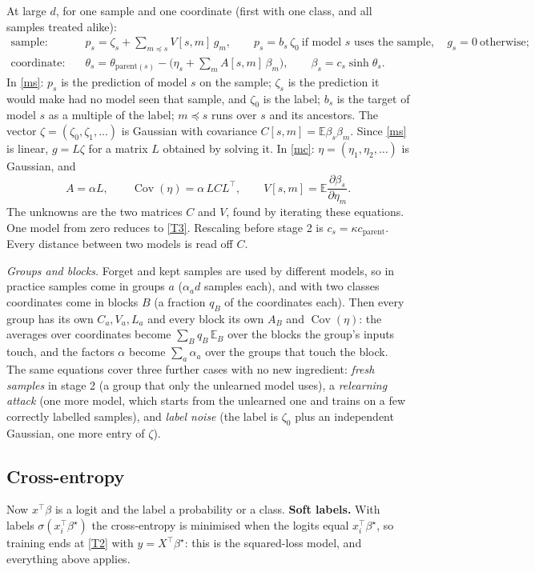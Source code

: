 \documentclass[10pt]{article}
\newcommand{\bs}{\beta^\star}\newcommand{\E}{\mathbb E}\newcommand{\asinh}{\operatorname{arcsinh}}\newcommand{\prox}{\operatorname{prox}}
\begin{document}
At large $d$, for one sample and one coordinate (first with one class, and all samples treated alike):
\begin{align}
\text{sample:}&\quad p_s=\zeta_s+\sum_{m\preceq s}V[s,m]\,g_m ,\qquad p_s=b_s\,\zeta_0\ \text{if model $s$ uses the sample},\quad g_s=0\ \text{otherwise};\label{ms}\\
\text{coordinate:}&\quad \theta_s=\theta_{\text{parent}(s)}-\Big(\eta_s+\sum_{m}A[s,m]\,\beta_m\Big),\qquad \beta_s=c_s\sinh\theta_s .\label{mc}
\end{align}
In \eqref{ms}: $p_s$ is the prediction of model $s$ on the sample; $\zeta_s$ is the prediction it would make had no model seen that sample, and $\zeta_0$ is the label; $b_s$ is the target of model $s$ as a multiple of the label; $m\preceq s$ runs over $s$ and its ancestors. The vector $\zeta=(\zeta_0,\zeta_1,\dots)$ is Gaussian with covariance $C[s,m]=\E\beta_s\beta_m$. Since \eqref{ms} is linear, $g=L\zeta$ for a matrix $L$ obtained by solving it. In \eqref{mc}: $\eta=(\eta_1,\eta_2,\dots)$ is Gaussian, and
\[
A=\alpha L,\qquad \operatorname{Cov}(\eta)=\alpha\,LCL^\top,\qquad V[s,m]=\E\frac{\partial\beta_s}{\partial\eta_m}.
\]
The unknowns are the two matrices $C$ and $V$, found by iterating these equations. One model from zero reduces to \eqref{T3}. Rescaling before stage 2 is $c_s=\kappa c_{\text{parent}}$. Every distance between two models is read off $C$.

\emph{Groups and blocks.} Forget and kept samples are used by different models, so in practice samples come in groups $a$ ($\alpha_ad$ samples each), and with two classes coordinates come in blocks $B$ (a fraction $q_B$ of the coordinates each). Then every group has its own $C_a,V_a,L_a$ and every block its own $A_B$ and $\operatorname{Cov}(\eta)$: the averages over coordinates become $\sum_{B}q_B\,\E_B$ over the blocks the group's inputs touch, and the factors $\alpha$ become $\sum_a\alpha_a$ over the groups that touch the block. The same equations cover three further cases with no new ingredient: \emph{fresh samples} in stage 2 (a group that only the unlearned model uses), a \emph{relearning attack} (one more model, which starts from the unlearned one and trains on a few correctly labelled samples), and \emph{label noise} (the label is $\zeta_0$ plus an independent Gaussian, one more entry of $\zeta$).

\subsection{Cross-entropy}\label{ce}
Now $x^\top\beta$ is a logit and the label a probability or a class. \textbf{Soft labels.} With labels $\sigma(x_i^\top\bs)$ the cross-entropy is minimised when the logits equal $x_i^\top\bs$, so training ends at \eqref{T2} with $y=X^\top\bs$: this is the squared-loss model, and everything above applies.
\end{document}
